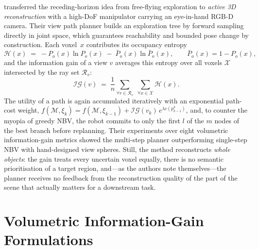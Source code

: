 \textcite{zhang2022} transferred the receding-horizon idea from
free-flying exploration to \emph{active 3D reconstruction} with a
high-DoF manipulator carrying an eye-in-hand RGB-D camera. Their view
path planner builds an exploration tree by forward sampling directly in
joint space, which guarantees reachability and bounded pose change by
construction. Each voxel~$x$ contributes its occupancy entropy
%
\begin{equation}
  \mathcal{H}(x) \;=\; -P_o(x)\ln P_o(x) \;-\; \bar{P}_o(x)\ln \bar{P}_o(x),
  \qquad \bar{P}_o(x) = 1 - P_o(x),
  \label{eq:rw-zhang-entropy}
\end{equation}
%
and the information gain of a view $v$ averages this entropy over all
voxels $\mathcal{X}$ intersected by the ray set $\mathcal{R}_v$:
%
\begin{equation}
  \mathcal{IG}(v) \;=\; \frac{1}{n}
  \sum_{\forall r \in \mathcal{R}_v}\;\sum_{\forall x \in \mathcal{X}}
  \mathcal{H}(x).
  \label{eq:rw-zhang-ig}
\end{equation}
%
The utility of a path is again accumulated iteratively with an
exponential path-cost weight, $f(\mathcal{M},\xi_k) =
f(\mathcal{M},\xi_{k-1}) + \mathcal{IG}(v_k)\,
e^{\lambda c\left(p_{k-1}^{k}\right)}$, and, to counter the myopia of
greedy NBV, the robot commits to only the first $l$ of the $m$ nodes of
the best branch before replanning. Their experiments over eight
volumetric information-gain metrics showed the multi-step planner
outperforming single-step NBV with hand-designed view spheres. Still,
the method reconstructs \emph{whole objects}: the gain treats every
uncertain voxel equally, there is no semantic prioritisation of a target
region, and---as the authors note themselves---the planner receives no
feedback from the reconstruction quality of the part of the scene that
actually matters for a downstream task.

\section{Volumetric Information-Gain Formulations}
\label{sec:rw-ig-metrics}

